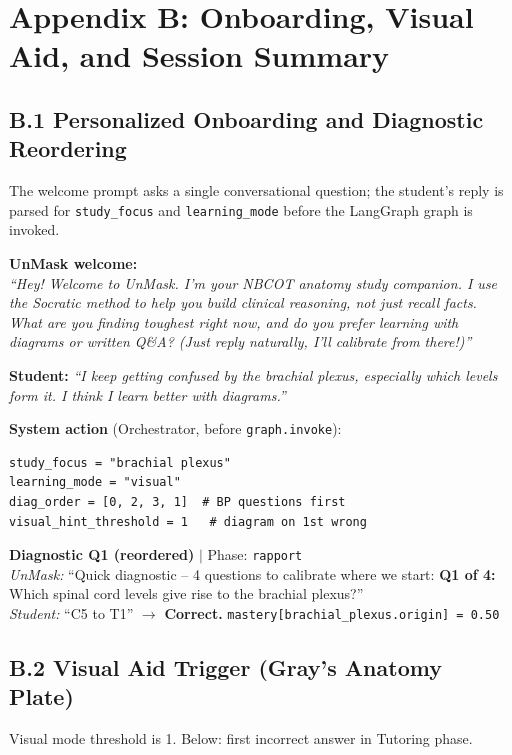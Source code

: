 \documentclass[11pt]{article}
\begin{document}
\section*{Appendix B: Onboarding, Visual Aid, and Session Summary}

\subsection*{B.1 Personalized Onboarding and Diagnostic Reordering}

The welcome prompt asks a single conversational question; the student's reply
is parsed for \texttt{study\_focus} and \texttt{learning\_mode} before the
LangGraph graph is invoked.

\noindent\textbf{UnMask welcome:}\\
\textit{``Hey! Welcome to UnMask. I'm your NBCOT anatomy study companion. I
use the Socratic method to help you build clinical reasoning, not just recall
facts. What are you finding toughest right now, and do you prefer learning
with diagrams or written Q\&A? (Just reply naturally, I'll calibrate from
there!)''}

\noindent\textbf{Student:} \textit{``I keep getting confused by the brachial
plexus, especially which levels form it. I think I learn better with
diagrams.''}

\noindent\textbf{System action} (Orchestrator, before \texttt{graph.invoke}):
\begin{lstlisting}
study_focus = "brachial plexus"
learning_mode = "visual"
diag_order = [0, 2, 3, 1]  # BP questions first
visual_hint_threshold = 1   # diagram on 1st wrong
\end{lstlisting}

\noindent\textbf{Diagnostic Q1 (reordered)} $|$ Phase: \texttt{rapport}\\
\textit{UnMask:} ``Quick diagnostic -- 4 questions to calibrate where we start:
\textbf{Q1 of 4:} Which spinal cord levels give rise to the brachial plexus?''\\
\textit{Student:} ``C5 to T1'' $\to$ \textbf{Correct.}
\texttt{mastery[brachial\_plexus.origin] = 0.50}

\subsection*{B.2 Visual Aid Trigger (Gray's Anatomy Plate)}

Visual mode threshold is 1. Below: first incorrect answer in Tutoring phase.
\end{document}
